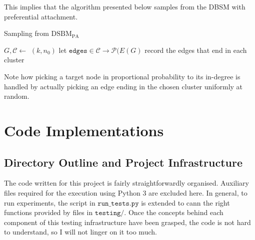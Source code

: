 This implies that the algorithm presented below samples 
from the DBSM with preferential attachment. 

\begin{algorithm}
	\caption{Sampling from $\mathrm{DSBM}_\mathrm{PA}$}
\label{algorithm:sample_PA}
	\BlankLine
		$G , \mathcal{C}\longleftarrow$ \InitG$(k, n_0)$\;
		let $\mathtt{edges}\in\mathcal{C} \rightarrow \mathcal{P}(E(G)$ record the edges 
		that end in each cluster\;

\end{algorithm}

Note how picking a target node in proportional probability to its in-degree is handled by actually 
picking an edge ending in the chosen cluster uniformly at random. 

\section{Code Implementations}
\subsection{Directory Outline and Project Infrastructure}


The code written for this project is fairly straightforwardly organised. Auxiliary files required for the execution using Python 3 are excluded here. In general, to run experiments, the script in $\mathtt{run\_tests.py}$ is extended to cann the right functions provided by files in $\mathtt{testing/}$. Once the concepts behind each component of this testing infrastructure have been grasped, the code is not hard to understand, so I will not linger on it too much.

